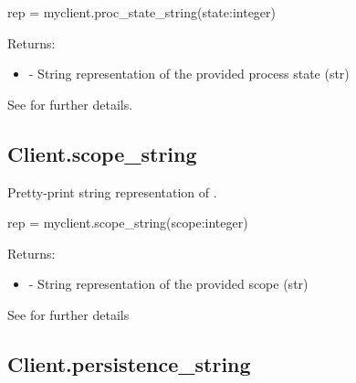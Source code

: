\format

\pyspecificstart
\begin{codepar}
rep = myclient.proc_state_string(state:integer)
\end{codepar}
\pyspecificend

\begin{arglist}
\end{arglist}

Returns:
\begin{itemize}
    \item {} - String representation of the provided process state (str)
\end{itemize}

See  for further details.


\subsection{Client.scope_string}

\summary

Pretty-print string representation of .

\format

\pyspecificstart
\begin{codepar}
rep = myclient.scope_string(scope:integer)
\end{codepar}
\pyspecificend

\begin{arglist}
\end{arglist}

Returns:
\begin{itemize}
    \item {} - String representation of the provided scope (str)
\end{itemize}

See  for further details


\subsection{Client.persistence_string}

